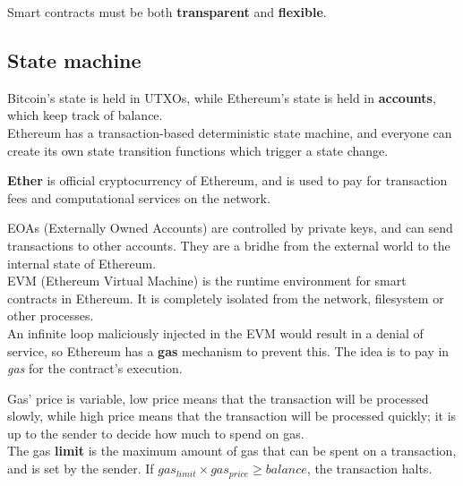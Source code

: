 Smart contracts must be both \textbf{transparent} and \textbf{flexible}.


\subsection{State machine}
Bitcoin's state is held in UTXOs, while Ethereum's state is held in \textbf{accounts}, which keep track of balance.\\
Ethereum has a transaction-based deterministic state machine, and everyone can create its own state transition functions which trigger a state change.


\textbf{Ether} is official cryptocurrency of Ethereum, and is used to pay for transaction fees and computational services on the network.

EOAs (Externally Owned Accounts) are controlled by private keys, and can send transactions to other accounts. They are a bridhe from the external world to the internal state of Ethereum.\\

EVM (Ethereum Virtual Machine) is the runtime environment for smart contracts in Ethereum. It is completely isolated from the network, filesystem or other processes.\\
An infinite loop maliciously injected in the EVM would result in a denial of service, so Ethereum has a \textbf{gas} mechanism to prevent this.
The idea is to pay in \textit{gas} for the contract's execution.

Gas' price is variable, low price means that the transaction will be processed slowly, while high price means that the transaction will be processed quickly; it is up to the sender to decide how much to spend on gas.\\
The gas \textbf{limit} is the maximum amount of gas that can be spent on a transaction, and is set by the sender.
If $gas_{limit} \times gas_{price} \geq balance$, the transaction halts.